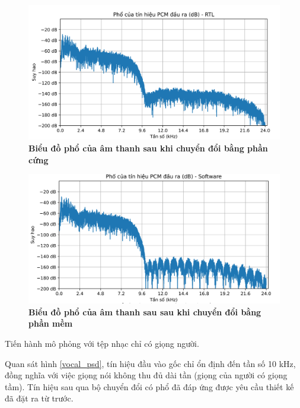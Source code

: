 \begin{figure}[H]
    \centering
    \includegraphics[width=14cm]{Images/Chuong4/tb/wav/vldd2_psd_0.png}
    \caption[Biểu đồ phổ của âm thanh sau khi chuyển đổi bằng phần cứng]{\bfseries \fontsize{12pt}{0pt}\selectfont  Biểu đồ phổ của âm thanh sau khi chuyển đổi bằng phần cứng}
    \label{vldd2_psd_0}
\end{figure}

\begin{figure}[H]
    \centering
    \includegraphics[width=14cm]{Images/Chuong4/tb/wav/vldd2_psd_1.png}
    \caption[Biểu đồ phổ của âm thanh sau sau khi chuyển đổi bằng phần mềm]{\bfseries \fontsize{12pt}{0pt}\selectfont  Biểu đồ phổ của âm thanh sau sau khi chuyển đổi bằng phần mềm}
    \label{vldd2_psd_1}
\end{figure}

Tiến hành mô phỏng với tệp nhạc chỉ có giọng người.

Quan sát hình \ref{vocal_psd}, tín hiệu đầu vào gốc chỉ ổn định đến tần số 10 kHz, đồng nghĩa với việc giọng nói không thu đủ dài tần (giọng của người có giọng tầm). Tín hiệu sau qua bộ chuyển đổi có phổ đã đáp ứng được yêu cầu thiết kế đã đặt ra từ trước.


